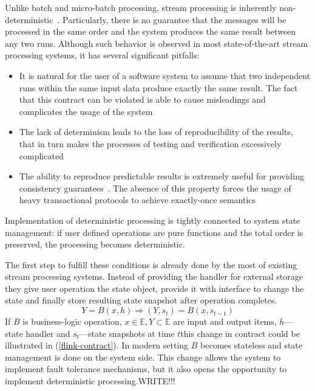 
Unlike batch and micro-batch processing, stream processing is inherently non-deterministic~\cite{Zaharia:2012:DSE:2342763.2342773}. Particularly, there is no guarantee that the messages will be processed in the same order and the system produces the same result between any two runs. Although such behavior is observed in most state-of-the-art stream processing systems, it has several significant pitfalls:

\begin{itemize}
    \item It is natural for the user of a software system to assume that two independent runs within the same input data produce exactly the same result. The fact that this contract can be violated is able to cause misleadings and complicates the usage of the system
    \item The lack of determinism leads to the loss of reproducibility of the results, that in turn makes the processes of testing and verification excessively complicated
    \item The ability to reproduce predictable results is extremely useful for providing consistency guarantees~\cite{Stonebraker:2005:RRS:1107499.1107504}. The absence of this property forces the usage of heavy transactional protocols to achieve exactly-once semantics~\cite{Carbone:2017:SMA:3137765.3137777, jacques2016consistent}
\end{itemize}

Implementation of deterministic processing is tightly connected to system state management: if user defined operations are pure functions and the total order is preserved, the processing becomes deterministic.

The first step to fulfill these conditions is already done by the most of existing stream processing systems. Instead of providing the handler for external storage they give user operation the state object, provide it with interface to change the state and finally store resulting state snapshot after operation completes.
\begin{equation}
\label{flink-contract}
Y = B(x, h) \Rightarrow (Y, s_t) = B(x, s_{t-1}) 
\end{equation}
If $B$ is business-logic operation, $x \in \mathbb{E}, Y \subset \mathbb{E}$ are input and output items, $h$---state handler and $s_t$---state snapshots at time $t$this change in contract could be illustrated in (\ref{flink-contract}). In modern setting $B$ becomes stateless and state management is done on the system side. This change allows the system to implement fault tolerance mechanisms, but it also opens the opportunity to implement deterministic processing.{WRITE!!!}  

